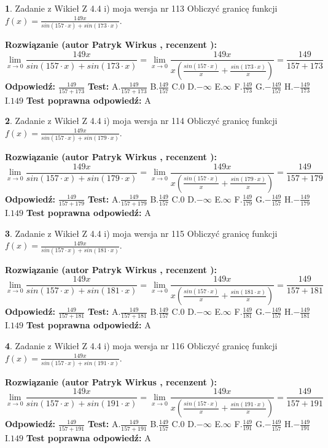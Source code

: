 \documentclass[12pt, a4paper]{article}
\theoremstyle{definition} %
\newtheorem{zad}{}
\newcommand{\zadStart}[1]{\begin{zad}#1\newline}
\newcommand{\zadStop}{\end{zad}}
\newcommand{\rozwStart}[2]{\noindent \textbf{Rozwiązanie (autor #1 , recenzent #2): }\newline}
\newcommand{\rozwStop}{\newline}
\newcommand{\odpStart}{\noindent \textbf{Odpowiedź:}\newline}
\newcommand{\odpStop}{\newline}
\newcommand{\testStart}{\noindent \textbf{Test:}\newline}
\newcommand{\testStop}{\newline}
\newcommand{\kluczStart}{\noindent \textbf{Test poprawna odpowiedź:}\newline}
\newcommand{\kluczStop}{\newline}
\begin{document}
\zadStart{Zadanie z Wikieł Z 4.4 i) moja wersja nr 113}
Obliczyć granicę funkcji $f(x)=\frac{149x}{sin(157\cdot x) +sin(173\cdot x)}$.
\zadStop
\rozwStart{Patryk Wirkus}{}
$$\lim\limits_{x\to 0}\frac{149x}{sin(157\cdot x) +sin(173\cdot x)}=\lim\limits_{x\to 0}\frac{149x}{x(\frac{sin(157\cdot x)}{x}+\frac{sin(173\cdot x)}{x})}=\frac{149}{157+173}$$
\rozwStop
\odpStart
$\frac{149}{157+173}$
\odpStop
\testStart
A.$\frac{149}{157+173}$
B.$\frac{149}{157}$
C.$0$
D.$-\infty$
E.$\infty$
F.$\frac{149}{173}$
G.$-\frac{149}{157}$
H.$-\frac{149}{173}$
I.$149$
\testStop
\kluczStart
A
\kluczStop



\zadStart{Zadanie z Wikieł Z 4.4 i) moja wersja nr 114}
Obliczyć granicę funkcji $f(x)=\frac{149x}{sin(157\cdot x) +sin(179\cdot x)}$.
\zadStop
\rozwStart{Patryk Wirkus}{}
$$\lim\limits_{x\to 0}\frac{149x}{sin(157\cdot x) +sin(179\cdot x)}=\lim\limits_{x\to 0}\frac{149x}{x(\frac{sin(157\cdot x)}{x}+\frac{sin(179\cdot x)}{x})}=\frac{149}{157+179}$$
\rozwStop
\odpStart
$\frac{149}{157+179}$
\odpStop
\testStart
A.$\frac{149}{157+179}$
B.$\frac{149}{157}$
C.$0$
D.$-\infty$
E.$\infty$
F.$\frac{149}{179}$
G.$-\frac{149}{157}$
H.$-\frac{149}{179}$
I.$149$
\testStop
\kluczStart
A
\kluczStop



\zadStart{Zadanie z Wikieł Z 4.4 i) moja wersja nr 115}
Obliczyć granicę funkcji $f(x)=\frac{149x}{sin(157\cdot x) +sin(181\cdot x)}$.
\zadStop
\rozwStart{Patryk Wirkus}{}
$$\lim\limits_{x\to 0}\frac{149x}{sin(157\cdot x) +sin(181\cdot x)}=\lim\limits_{x\to 0}\frac{149x}{x(\frac{sin(157\cdot x)}{x}+\frac{sin(181\cdot x)}{x})}=\frac{149}{157+181}$$
\rozwStop
\odpStart
$\frac{149}{157+181}$
\odpStop
\testStart
A.$\frac{149}{157+181}$
B.$\frac{149}{157}$
C.$0$
D.$-\infty$
E.$\infty$
F.$\frac{149}{181}$
G.$-\frac{149}{157}$
H.$-\frac{149}{181}$
I.$149$
\testStop
\kluczStart
A
\kluczStop



\zadStart{Zadanie z Wikieł Z 4.4 i) moja wersja nr 116}
Obliczyć granicę funkcji $f(x)=\frac{149x}{sin(157\cdot x) +sin(191\cdot x)}$.
\zadStop
\rozwStart{Patryk Wirkus}{}
$$\lim\limits_{x\to 0}\frac{149x}{sin(157\cdot x) +sin(191\cdot x)}=\lim\limits_{x\to 0}\frac{149x}{x(\frac{sin(157\cdot x)}{x}+\frac{sin(191\cdot x)}{x})}=\frac{149}{157+191}$$
\rozwStop
\odpStart
$\frac{149}{157+191}$
\odpStop
\testStart
A.$\frac{149}{157+191}$
B.$\frac{149}{157}$
C.$0$
D.$-\infty$
E.$\infty$
F.$\frac{149}{191}$
G.$-\frac{149}{157}$
H.$-\frac{149}{191}$
I.$149$
\testStop
\kluczStart
A
\kluczStop
\end{document}
